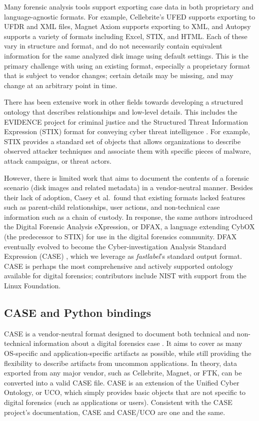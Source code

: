 \documentclass[letterpaper,12pt]{report}
\begin{document}
Many forensic analysis tools support exporting case data in both
proprietary and language-agnostic formats. For example, Cellebrite's
UFED supports exporting to UFDR and XML files, Magnet Axiom supports
exporting to XML, and Autopsy supports a variety of formats including
Excel, STIX, and HTML. Each of these vary in structure and format, and
do not necessarily contain equivalent information for the same analyzed
disk image using default settings. This is the primary challenge with
using an existing format, especially a proprietary format that is
subject to vendor changes; certain details may be missing, and may
change at an arbitrary point in time.

There has been extensive work in other fields towards developing a
structured ontology that describes relationships and low-level details.
This includes the EVIDENCE project for criminal justice and the
Structured Threat Information Expression (STIX) format for conveying
cyber threat intelligence
\cite{caseyLeveragingCybOXStandardize2015}. For example, STIX
provides a standard set of objects that allows organizations to describe
observed attacker techniques and associate them with specific pieces of
malware, attack campaigns, or threat actors.

However, there is limited work that aims to document the contents of a
forensic scenario (disk images and related metadata) in a vendor-neutral
manner. Besides their lack of adoption, Casey et al.~found that existing
formats lacked features such as parent-child relationships, user
actions, and non-technical case information such as a chain of custody.
In response, the same authors introduced the Digital Forensic Analysis
eXpression, or DFAX, a language extending CybOX (the predecessor to
STIX) for use in the digital forensics community. DFAX eventually
evolved to become the Cyber-investigation Analysis Standard Expression
(CASE) \cite{caseyAdvancingCoordinatedCyberinvestigations2017},
which we leverage as \emph{fastlabel}'s standard output format. CASE is
perhaps the most comprehensive and actively supported ontology available
for digital forensics; contributors include NIST with support from the
Linux Foundation.

\subsection{CASE and Python
bindings}\label{case-and-python-bindings}

CASE is a vendor-neutral format designed to document both technical and
non-technical information about a digital forensics case
\cite{caseyAdvancingCoordinatedCyberinvestigations2017}. It aims to
cover as many OS-specific and application-specific artifacts as
possible, while still providing the flexibility to describe artifacts
from uncommon applications. In theory, data exported from any major
vendor, such as Cellebrite, Magnet, or FTK, can be converted into a
valid CASE file. CASE is an extension of the Unified Cyber Ontology, or
UCO, which simply provides basic objects that are not specific to
digital forensics (such as applications or users). Consistent with the
CASE project's documentation, CASE and CASE/UCO are one and the same.
\end{document}
